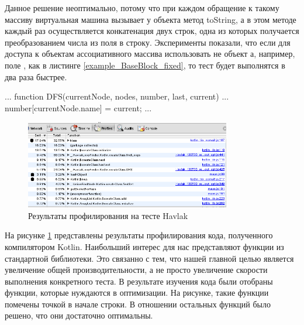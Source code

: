 Данное решение неоптимально, потому что при каждом обращение к такому массиву виртуальная машина вызывает у объекта метод toString, а в этом методе каждый раз осуществляется конкатенация двух строк, одна из которых получается преобразованием числа из поля  в строку. Эксперименты показали, что если для доступа к объектам ассоциативного массива использовать не объект а, например, поле , как в листинге \ref{example_BaseBlock_fixed}, то тест будет выполнятся в два раза быстрее.

\begin{code}
\begin{JavaScript}[caption=Пример улучшения использования ассоциативного массива в тесте на JavaScript, label=example_BaseBlock_fixed]
...
function DFS(currentNode, nodes, number, last, current) {
...
  number[currentNode.name] = current;
...
}
\end{JavaScript}
\end{code}

\begin{figure}[ht!]
\centering
\includegraphics[width=0.8\textwidth]{img/havlak_0_profile.png}
\caption{Результаты профилирования на тесте Havlak}
\label{havlak_0_profile}
\end{figure}

На рисунке \ref{havlak_0_profile} представлены результаты профилирования кода, полученного компилятором Kotlin. Наибольший интерес для нас представляют функции из стандартной библиотеки. Это связанно с тем, что нашей главной целью является увеличение общей производительности, а не просто увеличение скорости выполнения конкретного теста. В результате изучения кода были отобраны функции, которые нуждаются в оптимизации. На рисунке, такие функции помечены точкой в начале строки. В отношении остальных функций было решено, что они достаточно оптимальны.

